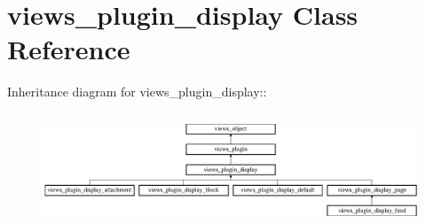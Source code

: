 \hypertarget{classviews__plugin__display}{
\section{views\_\-plugin\_\-display Class Reference}
\label{classviews__plugin__display}
}
Inheritance diagram for views\_\-plugin\_\-display::\begin{figure}[H]
\begin{center}
\leavevmode
\includegraphics[height=3.38164cm]{classviews__plugin__display}
\end{center}
\end{figure}
